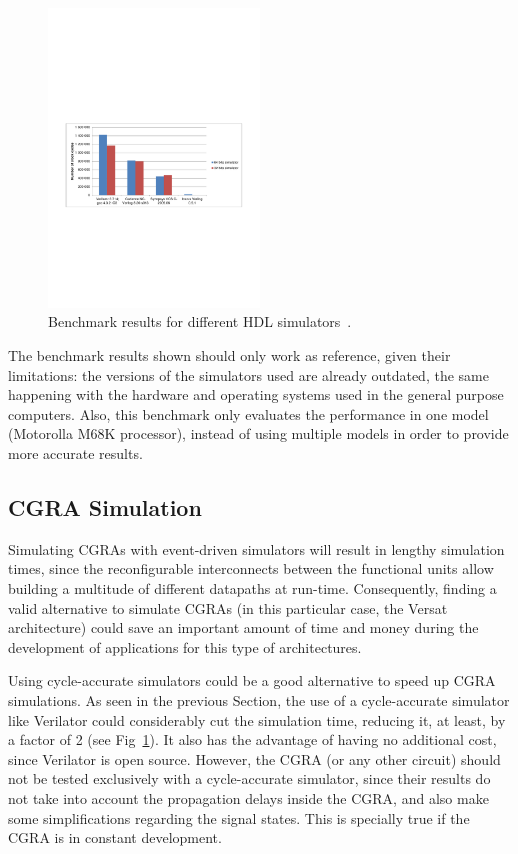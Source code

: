 \documentclass[conference]{IEEEtran}
\begin{document}
\begin{figure}[!htb]
	\centering
	\includegraphics[trim=0 280 0 310 , clip, 
	width=0.5\textwidth]{Figures/Performance.pdf}
	\caption{Benchmark results for different HDL simulators~\cite{verilator:benchmarks}.}
	\label{fig:performance}
\end{figure}

The benchmark results shown should only work as reference, given their
limitations: the versions of the simulators used are already outdated, the same
happening with the hardware and operating systems used in the general purpose
computers. Also, this benchmark only evaluates the performance in one model
(Motorolla M68K processor), instead of using multiple models in order to provide
more accurate results.


\subsection{CGRA Simulation}
\label{section:CGRA}

Simulating CGRAs with event-driven simulators will result in
lengthy simulation times, since the reconfigurable
interconnects between the functional units allow building a multitude of
different datapaths at run-time. Consequently, finding a valid alternative to simulate
\ac{CGRA}s (in this particular case, the Versat architecture) could save an
important amount of time and money during the development of applications for
this type of architectures.

Using cycle-accurate simulators could be a good alternative to speed up
\ac{CGRA} simulations. As seen in the previous Section, the use of a
cycle-accurate simulator like Verilator could considerably cut the simulation
time, reducing it, at least, by a factor of 2 (see
Fig~\ref{fig:performance}). It also has the advantage of having no additional
cost, since Verilator is open source. However, the \ac{CGRA} (or any other
circuit) should not be tested exclusively with a cycle-accurate simulator, since
their results do not take into account the propagation delays inside the
\ac{CGRA}, and also make some simplifications regarding the signal states. This
is specially true if the \ac{CGRA} is in constant development.
\end{document}
